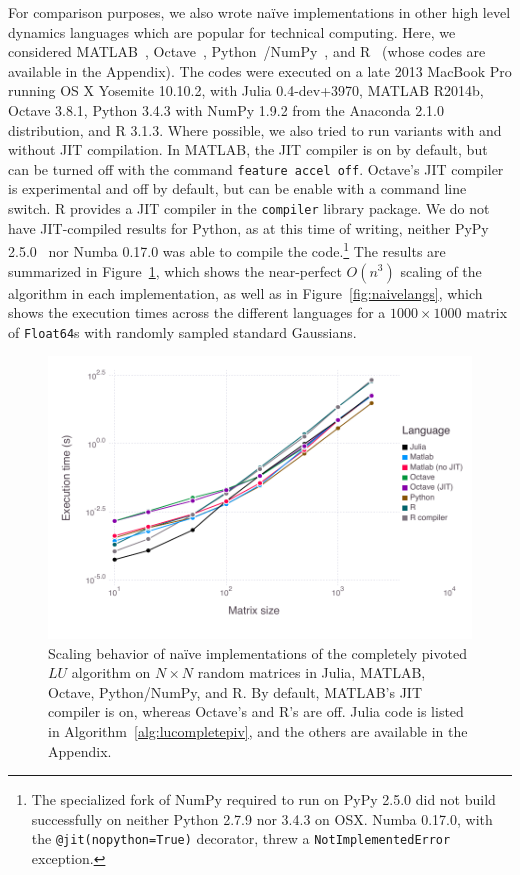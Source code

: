 For comparison purposes, we also wrote na\"ive implementations in other high
level dynamics languages which are popular for technical computing. Here, we
considered MATLAB~\cite{matlab}, Octave~\cite{octave},
Python~\cite{python}/NumPy~\cite{numpy}, and R~\cite{rlang} (whose codes are
available in the Appendix). The codes were executed on a late 2013 MacBook Pro
running OS X
Yosemite 10.10.2, with Julia 0.4-dev+3970, MATLAB R2014b, Octave 3.8.1, Python
3.4.3 with NumPy 1.9.2 from the Anaconda 2.1.0 distribution, and R 3.1.3. Where
possible, we also tried to run variants with and without JIT compilation. In
MATLAB, the JIT compiler is on by default, but can be turned off with the
command \lstinline|feature accel off|. Octave's JIT compiler is experimental
and off by default, but can be enable with a command line switch. R provides a
JIT compiler in the \lstinline|compiler| library package. We do not have
JIT-compiled results for Python, as at this time of writing, neither PyPy
2.5.0~\cite{Bolz2009} nor Numba 0.17.0 was able to compile the code.\footnote{
The specialized fork of NumPy required to run on PyPy 2.5.0 did not build
successfully on neither Python 2.7.9 nor 3.4.3 on OSX. Numba 0.17.0, with the
\lstinline|@jit(nopython=True)| decorator, threw a
\lstinline|NotImplementedError| exception.}
The results are summarized in Figure~\ref{fig:scaling}, which shows the
near-perfect $O(n^3)$ scaling of the algorithm in each implementation, as well
as in Figure~\ref{fig:naivelangs}, which shows the execution times across the
different languages for a $1000 \times 1000$ matrix of \lstinline|Float64|s
with randomly sampled standard Gaussians.



\begin{figure}
	\includegraphics[width=\columnwidth]{data/fig-scaling}
	\caption{Scaling behavior of na\"ive implementations of the completely
	pivoted $LU$ algorithm on $N\times N$ random matrices in Julia, MATLAB,
	Octave, Python/NumPy, and R. By default, MATLAB's JIT compiler is on,
	whereas Octave's and R's are off. Julia code is listed in
	Algorithm~\ref{alg:lucompletepiv}, and the others are available in the
	Appendix.} \label{fig:scaling}
\end{figure}

